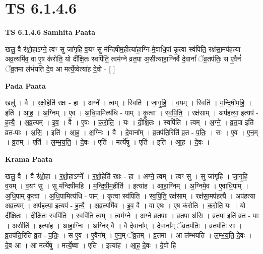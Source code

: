 \documentclass[17pt]{extarticle}
\begin{document}
\section{ TS 6.1.4.6 }

\textbf{TS 6.1.4.6 } \newline
\textbf{Samhita Paata} \newline

खलु॒ वै र॑क्षो॒हाऽग्ने॒ त्वꣳ सु जा॑गृहि व॒यꣳ सु म॑न्दिषीम॒हीत्या॑हा॒ग्नि-मे॒वाधि॒पां कृ॒त्वा स्व॑पिति॒ रक्ष॑सा॒मप॑हत्या अव्र॒त्यमि॑व॒ वा ए॒ष क॑रोति॒ यो दी᳚क्षि॒तः स्वपि॑ति॒ त्वम॑ग्ने व्रत॒पा अ॒सीत्या॑हा॒ग्निर्वै दे॒वानां᳚ ॅव्र॒तप॑तिः॒ स ए॒वैनं॑ ॅव्र॒तमा ल॑भंयति दे॒व आ मर्त्ये॒ष्वेत्या॑ह दे॒वो - [  ] \newline

\textbf{Pada Paata} \newline

खलु॑ । वै । र॒क्षो॒हेति॑ रक्षः - हा । अग्ने᳚ । त्वम् । स्विति॑ । जा॒गृ॒हि॒ । व॒यम् । स्विति॑ । म॒न्दि॒षी॒म॒हि॒ । इति॑ । आ॒ह॒ । अ॒ग्निम् । ए॒व । अ॒धि॒पामित्य॑धि - पाम् । कृ॒त्वा । स्व॒पि॒ति॒ । रक्ष॑साम् । अप॑हत्या॒ इत्यप॑ - ह॒त्यै॒ । अ॒व्र॒त्यम् । इ॒व॒ । वै । ए॒षः । क॒रो॒ति॒ । यः । दी॒क्षि॒तः । स्वपि॑ति । त्वम् । अ॒ग्ने॒ । व्र॒त॒पा इति॑ व्रत-पाः । अ॒सि॒ । इति॑ । आ॒ह॒ । अ॒ग्निः । वै । दे॒वाना᳚म् । व्र॒तप॑ति॒रिति॑ व्र॒त - प॒तिः॒ । सः । ए॒व । ए॒न॒म् । व्र॒तम् । एति॑ । ल॒म्भ॒य॒ति॒ । दे॒वः । एति॑ । मर्त्ये॑षु । एति॑ । इति॑ । आ॒ह॒ । दे॒वः ।  \newline


\textbf{Krama Paata} \newline

खलु॒ वै । वै र॑क्षो॒हा । र॒क्षो॒हाऽग्ने᳚ । र॒क्षो॒हेति॑ रक्षः - हा । अग्ने॒ त्वम् । त्वꣳ सु । सु जा॑गृहि । जा॒गृ॒हि॒ व॒यम् । व॒यꣳ सु । सु म॑न्दिषीमहि । म॒न्दि॒षी॒म॒हीति॑ । इत्या॑ह । आ॒हा॒ग्निम् । अ॒ग्निमे॒व । ए॒वाधि॒पाम् । अ॒धि॒पाम् कृ॒त्वा । अ॒धि॒पामित्य॑धि - पाम् । कृ॒त्वा स्व॑पिति । स्व॒पि॒ति॒ रक्ष॑साम् । रक्ष॑सा॒मप॑हत्यै । अप॑हत्या अव्र॒त्यम् । अप॑हत्या॒ इत्यप॑ - ह॒त्यै॒ । अ॒व्र॒त्यमि॑व । इ॒व॒ वै । वा ए॒षः । ए॒ष क॑रोति । क॒रो॒ति॒ यः । यो दी᳚क्षि॒तः । दी॒क्षि॒तः स्वपि॑ति । स्वपि॑ति॒ त्वम् । त्वम॑ग्ने । अ॒ग्ने॒ व्र॒त॒पाः । व्र॒त॒पा अ॑सि । व्र॒त॒पा इति॑ व्रत - पाः । अ॒सीति॑ । इत्या॑ह । आ॒हा॒ग्निः । अ॒ग्निर् वै । वै दे॒वाना᳚म् । दे॒वाना᳚म् ॅव्र॒तप॑तिः । व्र॒तप॑तिः॒ सः । व्र॒तप॑ति॒रिति॑ व्र॒त - प॒तिः॒ । स ए॒व । ए॒वैन᳚म् । ए॒न॒म् ॅव्र॒तम् । व्र॒तमा । आ ल॑म्भयति । ल॒म्भ॒य॒ति॒ दे॒वः । दे॒व आ । आ मर्त्ये॑षु । मर्त्ये॒ष्वा । एति॑ । इत्या॑ह । आ॒ह॒ दे॒वः । दे॒वो हि \newline
\end{document}
